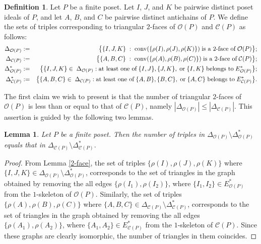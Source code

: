 \documentclass[12pt]{amsart}
\def\Oc{{\mathcal O}}
\def\Cc{{\mathcal C}}
\newtheorem{Lemma}[Theorem]{Lemma}
\theoremstyle{definition}
\newtheorem{Definition}[Theorem]{Definition}
\begin{document}
\begin{Definition}
Let $P$ be a finite poset.
Let $I$, $J$, and $K$ be pairwise distinct poset ideals of $P$, and
let $A$, $B$, and $C$ be pairwise distinct antichains of $P$.
We define the sets of triples corresponding to triangular $2$-faces of $\mathcal{O}(P)$ and $\mathcal{C}(P)$ as follows:
\begin{eqnarray*}
\Delta_{{\mathcal{O}}(P)}
&:=&
\bigl\{\{I,J,K\}\;
:
\;{\rm conv}(\{\rho(I), \rho(J), \rho(K)\})\; \mbox{is a 2-face of}\;\mathcal{O}(P)\bigr\};
\\
\Delta_{{\mathcal{C}}(P)}
&:=&
\bigl\{\{A,B,C\}\;
:
\;{\rm conv}(\{\rho(A), \rho(B), \rho(C)\})\;\mbox{is a 2-face of}\;\mathcal{C}(P)\bigr\};
\\
\Delta^{*}_{{\mathcal{O}}(P)}
&:=&
\bigl\{\{I,J,K\} \in \; \Delta_{\mathcal{O}(P)}
:
\mbox{at least one of}\;\{I,J\}, \{J,K\},\;\mbox{or}\; \{I,K\}\;\mbox{belongs to}\; E^{*}_{\mathcal{O}(P)}\bigr\};
\\
\Delta^{*}_{{\mathcal{C}}(P)}
&:=&
\bigl\{\{A,B,C\} \in \; \Delta_{\mathcal{C}(P)}
:
\mbox{at least one of}\;\{A,B\}, \{B,C\},\;\mbox{or}\; \{A,C\}\;\mbox{belongs to}\; E^{*}_{\mathcal{C}(P)}\bigr\}.
\end{eqnarray*}
\end{Definition}

\medskip
The first claim we wish to present is that the number of triangular $2$-faces of $\Oc(P)$ is less than or equal to that of $\Cc(P)$, namely $|\Delta_{{\mathcal{O}}(P)}| \leq |\Delta_{{\mathcal{C}}(P)}|$.
This assertion is guided by the following two lemmas.

\begin{Lemma}\label{triangle equality}
Let $P$ be a finite poset.
Then the number of triples in $\Delta_{\mathcal{O}(P)}\setminus\Delta^{*}_{\mathcal{O}(P)}$
equals that in $\Delta_{\mathcal{C}(P)}\setminus\Delta^{*}_{\mathcal{C}(P)}$.
\end{Lemma}

\begin{proof}
From Lemma \ref{2-face}, the set of triples $\{\rho(I),\rho(J),\rho(K)\}$ where $\{I,J,K\} \in \Delta_{\mathcal{O}(P)}\setminus\Delta^{*}_{\mathcal{O}(P)}$, corresponds to the set of triangles in the graph obtained by removing the all edges $\{\rho(I_1),\rho(I_2)\}$, where $\{I_1,I_2\} \in E^{*}_{\mathcal{O}(P)}$ from the $1$-skeleton of ${\mathcal{O}}(P)$.
Similarly, the set of triples $\{\rho(A),\rho(B),\rho(C)\}$ where $\{A,B,C\} \in \Delta_{\mathcal{C}(P)}\setminus\Delta^{*}_{\mathcal{C}(P)}$, corresponds to the set of triangles in the graph obtained by removing the all edges $\{\rho(A_1),\rho(A_2)\}$, where $\{A_1,A_2\} \in E^{*}_{\mathcal{C}(P)}$ from the $1$-skeleton of ${\mathcal{C}}(P)$.
Since these graphs are clearly isomorphic, the number of triangles in them coincides.
\end{proof}
\end{document}
